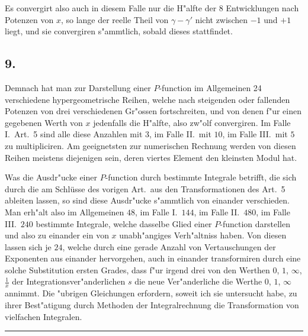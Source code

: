 \documentclass[12pt,a4paper]{article}
\begin{document}
Es convergirt also auch in diesem Falle nur die H{"a}lfte der 8 Entwicklungen nach Potenzen von $x$, so lange der reelle Theil von $\gamma - \gamma'$ nicht zwischen $-1$ und $+1$ liegt, und sie convergiren s{"a}mmtlich, sobald dieses stattfindet.

\subsection*{9.}

Demnach hat man zur Darstellung einer $P$-function im Allgemeinen 24 verschiedene hypergeometrische Reihen, welche nach steigenden oder fallenden Potenzen von drei verschiedenen Gr{"o}ssen fortschreiten, und von denen f{"u}r einen gegebenen Werth von $x$ jedenfalls die H{"a}lfte, also zw{"o}lf convergiren. Im Falle I.\ Art.~5 sind alle diese Anzahlen mit $3$, im Falle II.\ mit $10$, im Falle III.\ mit $5$ zu multipliciren. Am geeignetsten zur numerischen Rechnung werden von diesen Reihen meistens diejenigen sein, deren viertes Element den kleinsten Modul hat.

Was die Ausdr{"u}cke einer $P$-function durch bestimmte Integrale betrifft, die sich durch die am Schlüsse des vorigen Art.\ aus den Transformationen des Art.~5 ableiten lassen, so sind diese Ausdr{"u}cke s{"a}mmtlich von einander verschieden. Man erh{"a}lt also im Allgemeinen $48$, im Falle I.\ $144$, im Falle II.\ $480$, im Falle III.\ $240$ bestimmte Integrale, welche dasselbe Glied einer $P$-function darstellen und also zu einander ein von $x$ unabh{"a}ngiges Verh{"a}ltniss haben. Von diesen lassen sich je $24$, welche durch eine gerade Anzahl von Vertauschungen der Exponenten aus einander hervorgehen, auch in einander transformiren durch eine solche Substitution ersten Grades, dass f{"u}r irgend drei von den Werthen $0$, $1$, $\infty$, $\frac{1}{x}$ der Integrationsver{"a}nderlichen $s$ die neue Ver{"a}nderliche die Werthe $0$, $1$, $\infty$ annimmt. Die {"u}brigen Gleichungen erfordern, soweit ich sie untersucht habe, zu ihrer Best{"a}tigung durch Methoden der Integralrechnung die Transformation von vielfachen Integralen.

\vspace{2em}
\begin{center}
\rule{0.5\textwidth}{0.4pt}
\end{center}
\vspace{1em}

\end{document}
